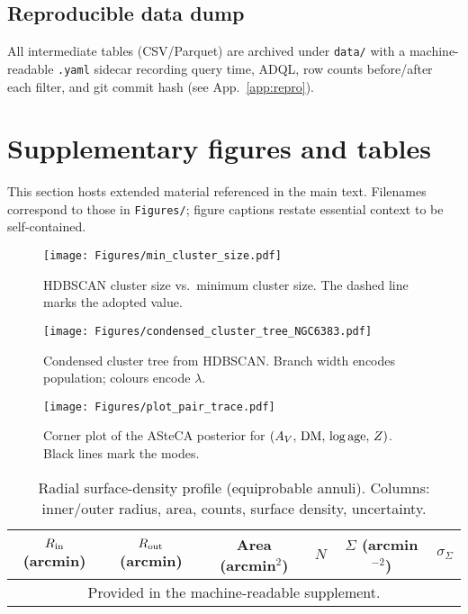 \documentclass[../main.tex]{subfiles}
\begin{document}
\subsection{Reproducible data dump}
All intermediate tables (CSV/Parquet) are archived under \verb|data/| with a machine-readable \verb|.yaml| sidecar recording query time, ADQL, row counts before/after each filter, and git commit hash (see App.~\ref{app:repro}).

\section{Supplementary figures and tables}
\label{app:figures}

This section hosts extended material referenced in the main text. Filenames correspond to those in \verb|Figures/|; figure captions restate essential context to be self-contained.

\begin{figure}[h]
  \centering
  \texttt{[image: Figures/min\_cluster\_size.pdf]}
  \caption{HDBSCAN cluster size vs.\ minimum cluster size. The dashed line marks the adopted value.}
  \label{fig:app_minclsize}
\end{figure}

\begin{figure}[h]
  \centering
  \texttt{[image: Figures/condensed\_cluster\_tree\_NGC6383.pdf]}
  \caption{Condensed cluster tree from HDBSCAN. Branch width encodes population; colours encode $\lambda$.}
  \label{fig:app_cct}
\end{figure}

\begin{figure*}[h]
  \centering
  \texttt{[image: Figures/plot\_pair\_trace.pdf]}
  \caption{Corner plot of the ASteCA posterior for $(A_V,\,{\rm DM},\,\log{\rm age},\,Z)$. Black lines mark the modes.}
  \label{fig:app_corner}
\end{figure*}

\begin{table*}[h]
  \centering
  \caption{Radial surface-density profile (equiprobable annuli). Columns: inner/outer radius, area, counts, surface density, uncertainty.}
  \label{tab:app_rdp}
  \begin{tabular}{cccccc}
    \toprule
    $R_{\rm in}$ (arcmin) & $R_{\rm out}$ (arcmin) & Area (arcmin$^2$) & $N$ & $\Sigma$ (arcmin$^{-2}$) & $\sigma_\Sigma$ \\
    \midrule
    \multicolumn{6}{c}{Provided in the machine-readable supplement.}\\
    \bottomrule
  \end{tabular}
\end{table*}
\end{document}
